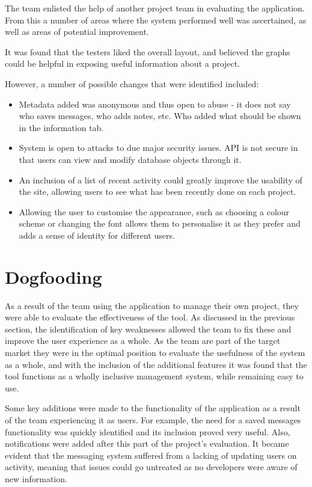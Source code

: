 \documentclass[a4paper]{l3proj}
\begin{document}
The team enlisted the help of another project team in evaluating the application.  From this a number of areas where the system performed well was ascertained, as well as areas of potential improvement.

It was found that the testers liked the overall layout, and believed the graphs could be helpful in exposing useful information about a project.  

However, a number of possible changes that were identified included:
\begin{itemize}
\item Metadata added was anonymous and thus open to abuse - it does not say who saves messages, who adds notes, etc.  Who added what should be shown in the information tab.
\item System is open to attacks to due major security issues.  API is not secure in that users can view and modify database objects through it.
\item An inclusion of a list of recent activity could greatly improve the usability of the site, allowing users to see what has been recently done on each project.

\item Allowing the user to customise the appearance, such as choosing a colour scheme or changing the font allows them to personalise it as they prefer and adds a sense of identity for different users.
\end{itemize}

\section{Dogfooding}
\label{dogfooding}

As a result of the team using the application to manage their own project, they were able to evaluate the effectiveness of the tool.  As discussed in the previous section, the identification of key weaknesses allowed the team to fix these and improve the user experience as a whole.  As the team are part of the target market they were in the optimal position to evaluate the usefulness of the system as a whole, and with the inclusion of the additional features it was found that the tool functions as a wholly inclusive management system, while remaining easy to use.

Some key additions were made to the functionality of the application as a result of the team experiencing it as users. For example, the need for a saved messages functionality was quickly identified and its inclusion proved very useful. Also, notifications were added after this part of the project’s evaluation. It became evident that the messaging system suffered from a lacking of updating users on activity, meaning that issues could go untreated as no developers were aware of new information. 
\end{document}
